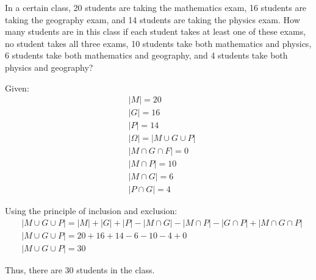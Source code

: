 \documentclass[a4paper,10pt]{article}
\begin{document}
\begin{problem}
	In a certain class, 20 students are taking the mathematics exam, 16 students are taking the geography exam, and 14 students are taking the physics exam. How many students are in this class if each student takes at least one of these exams, no student takes all three exams, 10 students take both mathematics and physics, 6 students take both mathematics and geography, and 4 students take both physics and geography?

	Given:
	\[
		\begin{aligned}
			&|M| = 20 \\
			&|G| = 16 \\
			&|P| = 14 \\
			&|\Omega| = |M \cup G \cup P| \\
			&|M \cap G \cap F| = 0 \\
			&|M \cap P| = 10 \\
			&|M \cap G| = 6 \\
			&|P \cap G| = 4
		\end{aligned}
	\]

	Using the principle of inclusion and exclusion:
	\[
		\begin{aligned}
			& |M \cup G \cup P| = |M| + |G| + |P| - |M \cap G| - |M \cap P| - |G \cap P| + |M \cap G \cap P| \\
			& |M \cup G \cup P| = 20 + 16 + 14 - 6 - 10 - 4 + 0 \\
			& |M \cup G \cup P| = 30
		\end{aligned}
	\]

	Thus, there are 30 students in the class.
\end{problem}
\end{document}
